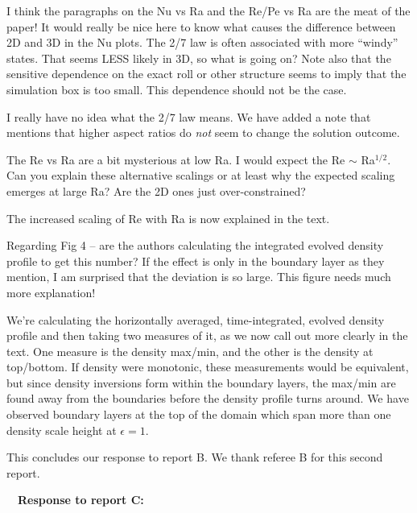 \documentclass[aps, 11pt, singlecolumn]{revtex4-1} %
\begin{document}
\begin{singlespace}
\begin{myquotation}
I think the paragraphs on the Nu vs Ra and the Re/Pe vs Ra are the
meat of the paper! It would really be nice here to know what causes
the difference between 2D and 3D in the Nu plots. The 2/7 law is often
associated with more “windy” states. That seems LESS likely in 3D, so
what is going on? Note also that the sensitive dependence on the exact
roll or other structure seems to imply that the simulation box is too
small. This dependence should not be the case.
\end{myquotation}
I really have no idea what the 2/7 law means.
We have added a note that mentions that higher aspect ratios do \emph{not}
seem to change the solution outcome.


\begin{myquotation}
The Re vs Ra are a bit mysterious at low Ra. I would expect the Re $\sim$
Ra$^{1/2}$. Can you explain these alternative scalings or at least why the
expected scaling emerges at large Ra? Are the 2D ones just
over-constrained?
\end{myquotation}
The increased scaling of Re with Ra is now explained in the text.

\begin{myquotation}
Regarding Fig 4 -- are the authors calculating the integrated evolved
density profile to get this number? If the effect is only in the
boundary layer as they mention, I am surprised that the deviation is
so large. This figure needs much more explanation!
\end{myquotation}
We're calculating the horizontally averaged, time-integrated, evolved density
profile and then taking two measures of it, as we now call out more clearly in the text.  
One measure is the density max/min, and the other is the density at top/bottom.
If density were monotonic, these measurements would be equivalent, but since density
inversions form within the boundary layers, the max/min are found away from the boundaries
before the density profile turns around.  We have observed boundary layers at the top of
the domain which span more than one density scale height at $\epsilon = 1$.

\noindent
This concludes our response to report B.  We thank referee B for this second report.




$\,$
\newline
$\,$
\newline
\noindent
\Large{\textbf{Response to report C:}}\newline$\,$\newline\indent


\end{singlespace}
\end{document}

